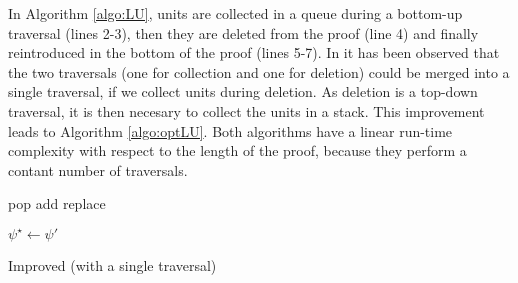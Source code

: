 In Algorithm \ref{algo:LU}, units are collected in a queue
during a bottom-up traversal (lines 2-3), then they are deleted from the proof (line 4) and finally reintroduced in the bottom of the proof (lines 5-7). In \cite{Boudou} it has been observed that the two traversals (one for collection and one for deletion) could be merged into a single traversal, if we collect units during deletion. As deletion is a top-down traversal, it is then necesary to collect the units in a stack. This improvement leads to Algorithm \ref{algo:optLU}. Both algorithms have a linear run-time complexity with respect to the length of the proof, because they perform a contant number of traversals.


\begin{algorithm}[pbt]
  \SetAlgoVlined
  \SetAlgoShortEnd

  \BlankLine

   {pop}
   {add}
   {replace}

  \BlankLine

  \BlankLine


  $\psi^{\star} \leftarrow \psi'$ \;

  \caption{Improved {\LowerUnits} (with a single traversal)}
  \label{algo:optLU}
\end{algorithm}


